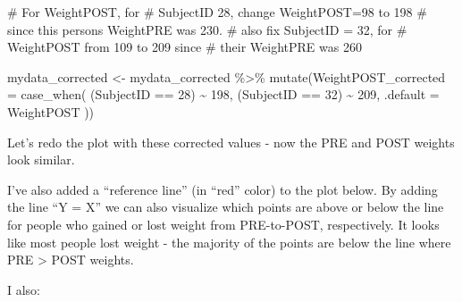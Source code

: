 \documentclass[
  letterpaper,
  DIV=11,
  numbers=noendperiod]{scrartcl}
\newenvironment{Shaded}{\begin{snugshade}}{\end{snugshade}}
\newcommand{\AttributeTok}[1]{\textcolor[rgb]{0.40,0.45,0.13}{#1}}
\newcommand{\CommentTok}[1]{\textcolor[rgb]{0.37,0.37,0.37}{#1}}
\newcommand{\DecValTok}[1]{\textcolor[rgb]{0.68,0.00,0.00}{#1}}
\newcommand{\FunctionTok}[1]{\textcolor[rgb]{0.28,0.35,0.67}{#1}}
\newcommand{\NormalTok}[1]{\textcolor[rgb]{0.00,0.23,0.31}{#1}}
\newcommand{\OtherTok}[1]{\textcolor[rgb]{0.00,0.23,0.31}{#1}}
\newcommand{\SpecialCharTok}[1]{\textcolor[rgb]{0.37,0.37,0.37}{#1}}
\begin{document}
\begin{Shaded}
\begin{Highlighting}[]
\CommentTok{\# For WeightPOST, for}
\CommentTok{\# SubjectID 28, change WeightPOST=98 to 198}
\CommentTok{\# since this person\textquotesingle{}s WeightPRE was 230.}
\CommentTok{\# also fix SubjectID = 32, for}
\CommentTok{\# WeightPOST from 109 to 209 since}
\CommentTok{\# their WeightPRE was 260}

\NormalTok{mydata\_corrected }\OtherTok{\textless{}{-}}\NormalTok{ mydata\_corrected }\SpecialCharTok{\%\textgreater{}\%}
  \FunctionTok{mutate}\NormalTok{(}\AttributeTok{WeightPOST\_corrected =} \FunctionTok{case\_when}\NormalTok{(}
\NormalTok{    (SubjectID }\SpecialCharTok{==} \DecValTok{28}\NormalTok{) }\SpecialCharTok{\textasciitilde{}} \DecValTok{198}\NormalTok{,}
\NormalTok{    (SubjectID }\SpecialCharTok{==} \DecValTok{32}\NormalTok{) }\SpecialCharTok{\textasciitilde{}} \DecValTok{209}\NormalTok{,}
    \AttributeTok{.default =}\NormalTok{ WeightPOST}
\NormalTok{  ))}
\end{Highlighting}
\end{Shaded}

\newpage

Let's redo the plot with these corrected values - now the PRE and POST
weights look similar.

I've also added a ``reference line'' (in ``red'' color) to the plot
below. By adding the line ``Y = X'' we can also visualize which points
are above or below the line for people who gained or lost weight from
PRE-to-POST, respectively. It looks like most people lost weight - the
majority of the points are below the line where PRE \textgreater{} POST
weights.

I also:
\end{document}
